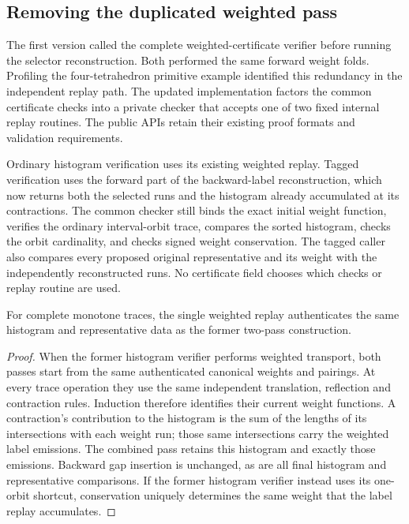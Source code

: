 \subsection{Removing the duplicated weighted pass}

The first version called the complete weighted-certificate verifier before
running the selector reconstruction. Both performed the same forward weight
folds. Profiling the four-tetrahedron primitive example identified this
redundancy in the independent replay path. The updated implementation factors
the common certificate checks into a private checker that accepts one of two
fixed internal replay routines. The public APIs retain their existing proof
formats and validation requirements.

Ordinary histogram verification uses its existing weighted replay. Tagged
verification uses the forward part of the backward-label reconstruction,
which now returns both the selected runs and the histogram already accumulated
at its contractions. The common checker still binds the exact initial weight
function, verifies the ordinary interval-orbit trace, compares the sorted
histogram, checks the orbit cardinality, and checks signed weight conservation.
The tagged caller also compares every proposed original representative and
its weight with the independently reconstructed runs. No certificate field
chooses which checks or replay routine are used.

\begin{proposition}
For complete monotone traces, the single weighted replay authenticates the
same histogram and representative data as the former two-pass construction.
\end{proposition}
\begin{proof}
When the former histogram verifier performs weighted transport, both passes
start from the same authenticated canonical weights and pairings. At every trace operation they use the same independent translation,
reflection and contraction rules. Induction therefore identifies their
current weight functions. A contraction's contribution to the histogram is
the sum of the lengths of its intersections with each weight run; those same
intersections carry the weighted label emissions. The combined pass retains
this histogram and exactly those emissions. Backward gap insertion is
unchanged, as are all final histogram and representative comparisons. If the
former histogram verifier instead uses its one-orbit shortcut, conservation
uniquely determines the same weight that the label replay accumulates.
\end{proof}

